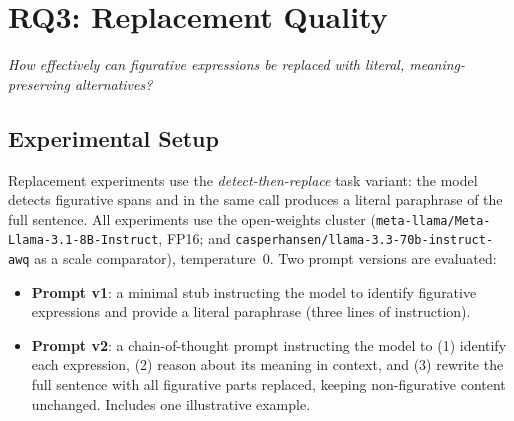 \section{RQ3: Replacement Quality}
\label{sec:rq3}
\textit{How effectively can figurative expressions be replaced with literal, meaning-preserving alternatives?}


\subsection{Experimental Setup}

Replacement experiments use the \textit{detect-then-replace} task variant: the model detects figurative spans and in the same call produces a literal paraphrase of the full sentence. All experiments use the open-weights cluster (\texttt{meta-llama/Meta-Llama-3.1-8B-Instruct}, FP16; and \texttt{casperhansen/llama-3.3-70b-instruct-awq} as a scale comparator), temperature~0. Two prompt versions are evaluated:
\begin{itemize}
    \item \textbf{Prompt v1}: a minimal stub instructing the model to identify figurative expressions and provide a literal paraphrase (three lines of instruction).
    \item \textbf{Prompt v2}: a chain-of-thought prompt instructing the model to (1) identify each expression, (2) reason about its meaning in context, and (3) rewrite the full sentence with all figurative parts replaced, keeping non-figurative content unchanged. Includes one illustrative example.
\end{itemize}

